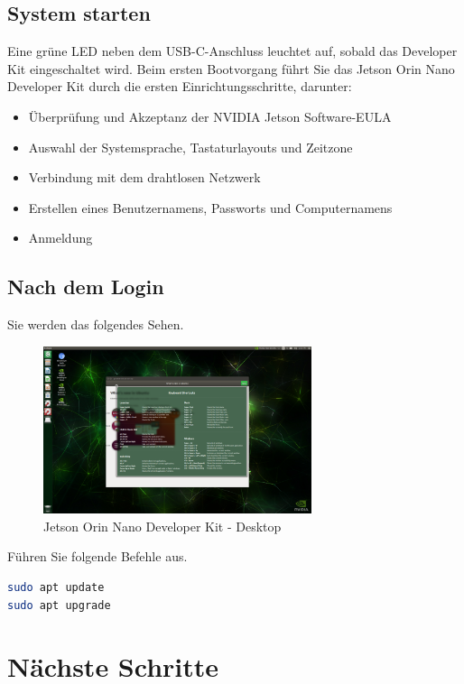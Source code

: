 \documentclass[12pt,a4paper]{report}
\begin{document}
\subsection{System starten}
Eine grüne LED neben dem USB-C-Anschluss leuchtet auf, sobald das Developer Kit eingeschaltet wird. Beim ersten Bootvorgang führt Sie das Jetson Orin Nano Developer Kit durch die ersten Einrichtungsschritte, darunter:
\begin{itemize}
    \item Überprüfung und Akzeptanz der NVIDIA Jetson Software-EULA
    \item Auswahl der Systemsprache, Tastaturlayouts und Zeitzone
    \item Verbindung mit dem drahtlosen Netzwerk
    \item Erstellen eines Benutzernamens, Passworts und Computernamens
    \item Anmeldung
\end{itemize}

\subsection{Nach dem Login}
Sie werden das folgendes Sehen.
\begin{figure}[h!]
    \centering
    \includegraphics[width=0.7\textwidth ]{Bilder/jetson_booted_screen.png}
    \caption{Jetson Orin Nano Developer Kit - Desktop}
\end{figure}
\par \bigskip 

Führen Sie folgende Befehle aus. 
\begin{lstlisting}[language=bash]
sudo apt update
sudo apt upgrade
\end{lstlisting}
\clearpage

\section{Nächste Schritte}
\end{document}
